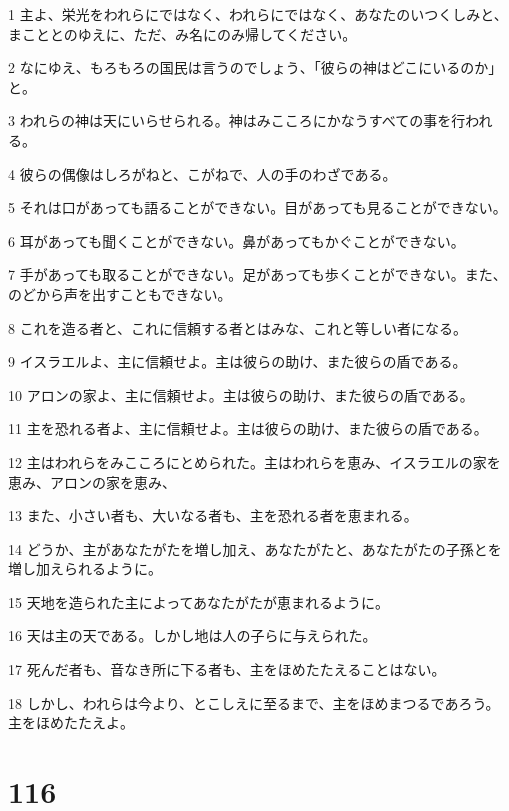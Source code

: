 \par 1 主よ、栄光をわれらにではなく、われらにではなく、あなたのいつくしみと、まこととのゆえに、ただ、み名にのみ帰してください。
\par 2 なにゆえ、もろもろの国民は言うのでしょう、「彼らの神はどこにいるのか」と。
\par 3 われらの神は天にいらせられる。神はみこころにかなうすべての事を行われる。
\par 4 彼らの偶像はしろがねと、こがねで、人の手のわざである。
\par 5 それは口があっても語ることができない。目があっても見ることができない。
\par 6 耳があっても聞くことができない。鼻があってもかぐことができない。
\par 7 手があっても取ることができない。足があっても歩くことができない。また、のどから声を出すこともできない。
\par 8 これを造る者と、これに信頼する者とはみな、これと等しい者になる。
\par 9 イスラエルよ、主に信頼せよ。主は彼らの助け、また彼らの盾である。
\par 10 アロンの家よ、主に信頼せよ。主は彼らの助け、また彼らの盾である。
\par 11 主を恐れる者よ、主に信頼せよ。主は彼らの助け、また彼らの盾である。
\par 12 主はわれらをみこころにとめられた。主はわれらを恵み、イスラエルの家を恵み、アロンの家を恵み、
\par 13 また、小さい者も、大いなる者も、主を恐れる者を恵まれる。
\par 14 どうか、主があなたがたを増し加え、あなたがたと、あなたがたの子孫とを増し加えられるように。
\par 15 天地を造られた主によってあなたがたが恵まれるように。
\par 16 天は主の天である。しかし地は人の子らに与えられた。
\par 17 死んだ者も、音なき所に下る者も、主をほめたたえることはない。
\par 18 しかし、われらは今より、とこしえに至るまで、主をほめまつるであろう。主をほめたたえよ。

\chapter{116}

